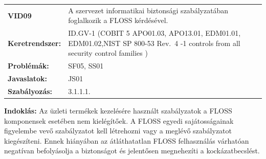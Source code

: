 \documentclass[12pt,magyar,a4paper,oneside]{scrreprt}
\begin{document}
\begin{longtable}[]{@{}ll@{}}
\toprule
\endhead
\begin{minipage}[t]{0.16\columnwidth}\raggedright
\textbf{VID09}\strut
\end{minipage} & \begin{minipage}[t]{0.79\columnwidth}\raggedright
A szervezet informatikai biztonsági szabályzatában foglalkozik a FLOSS
kérdésével.\strut
\end{minipage}\tabularnewline
\begin{minipage}[t]{0.16\columnwidth}\raggedright
\textbf{Keretrendszer:}\strut
\end{minipage} & \begin{minipage}[t]{0.79\columnwidth}\raggedright
ID.GV-1 (COBIT 5 APO01.03, APO13.01, EDM01.01, EDM01.02,NIST SP 800-53
Rev.~4 -1 controls from all security control families )\strut
\end{minipage}\tabularnewline
\begin{minipage}[t]{0.16\columnwidth}\raggedright
\textbf{Problémák:}\strut
\end{minipage} & \begin{minipage}[t]{0.79\columnwidth}\raggedright
SF05, SS01\strut
\end{minipage}\tabularnewline
\begin{minipage}[t]{0.16\columnwidth}\raggedright
\textbf{Javaslatok:}\strut
\end{minipage} & \begin{minipage}[t]{0.79\columnwidth}\raggedright
JS01\strut
\end{minipage}\tabularnewline
\begin{minipage}[t]{0.16\columnwidth}\raggedright
\textbf{Szabályozás:}\strut
\end{minipage} & \begin{minipage}[t]{0.79\columnwidth}\raggedright
3.1.1.1.\strut
\end{minipage}\tabularnewline
\bottomrule
\end{longtable}

\textbf{Indoklás: } Az üzleti termékek kezelésére használt szabályzatok
a FLOSS komponensek esetében nem kielégítőek. A FLOSS egyedi
sajátosságainak figyelembe vevő szabályzatot kell létrehozni vagy a
meglévő szabályzatot kiegészíteni. Ennek hiányában az átláthatatlan
FLOSS felhasználás várhatóan negatívan befolyásolja a biztonságot és
jelentősen megnehezíti a kockázatbecslést.
\end{document}
